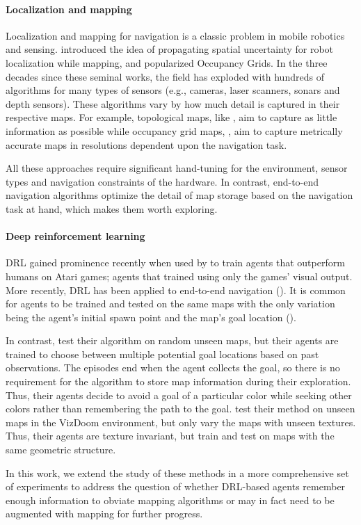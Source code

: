 \paragraph{Localization and mapping}
Localization and mapping for navigation is a classic problem in mobile robotics and sensing.
\cite{SmChIJRR1986} introduced the idea of propagating spatial uncertainty for robot localization while mapping, and \cite{ElCOMPUTER1980} popularized Occupancy Grids.
In the three decades since these seminal works, the field has exploded with hundreds of algorithms for many types of sensors (e.g., cameras, laser scanners, sonars and depth sensors).
These algorithms vary by how much detail is captured in their respective maps. For example, topological maps, like \cite{KuCOGSCI1978}, aim to capture as little information as possible while occupancy grid maps, \cite{ElCOMPUTER1980}, aim to capture metrically accurate maps in resolutions dependent upon the navigation task.

All these approaches require significant hand-tuning for the environment, sensor types and navigation constraints of the hardware.
In contrast, end-to-end navigation algorithms optimize the detail of map storage based on the navigation task at hand, which makes them worth exploring.

\paragraph{Deep reinforcement learning}
DRL gained prominence recently when used by \cite{MnKaSiNIPSDLW2013,MnKaSiNATURE2015} to train agents that outperform humans on Atari games; agents that trained using only the games' visual output.
More recently, DRL has been applied to end-to-end navigation (\cite{OhChSiICML2016,MiPaViICLR2017,ChLaSaNIPS2016}).
It is common for agents to be trained and tested on the same maps with the only variation being the agent's initial spawn point and the map's goal location (\cite{MiPaViICLR2017,ZhMoKoICRA2017,KuSaGaAPA2016}). 

In contrast, \cite{OhChSiICML2016} test their algorithm on random unseen maps, but their agents are trained to choose between multiple potential goal locations based on past observations.
The episodes end when the agent collects the goal, so there is no requirement for the algorithm to store map information during their exploration.
Thus, their agents decide to avoid a goal of a particular color while seeking other colors rather than remembering the path to the goal.
\cite{ChLaSaNIPS2016} test their method on unseen maps in the VizDoom environment, but only vary the maps with unseen textures. Thus, their agents are texture invariant, but train and test on maps with the same geometric structure.
%

In this work, we extend the study of these methods in a more comprehensive set of experiments to address the question of whether DRL-based agents remember enough information to obviate mapping algorithms or may in fact need to be augmented with mapping for further progress.
 
